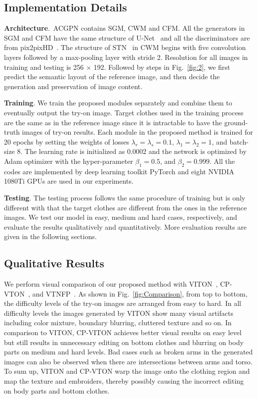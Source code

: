 \documentclass[10pt,twocolumn,letterpaper]{article}
\begin{document}
\subsection{Implementation Details}

\textbf{Architecture}.~ACGPN contains SGM, CWM and CFM. All the generators in SGM and CFM have the same structure of U-Net~\cite{ronneberger2015u} and all the discriminators are from pix2pixHD~\cite{DBLP:conf/cvpr/Wang0ZTKC18}. The structure of STN~\cite{jaderberg2015spatial} in CWM begins with five convolution layers followed by a max-pooling layer with stride 2. Resolution for all images in training and testing is 256 $\times$ 192. Followed by steps in Fig.~\ref{fig:2}, we first predict the semantic layout of the reference image, and then decide the generation and preservation of image content. 

\textbf{Training}.
We train the proposed modules separately and combine them to eventually output the try-on image. Target clothes used in the training process are the same as in the reference image since it is intractable to have the ground-truth images of try-on results. Each module in the proposed method is trained for 20 epochs by setting the weights of losses $\lambda_{r}=\lambda_{s}=0.1$, $\lambda_{1}=\lambda_{2}=1$, and batch-size 8. The learning rate is initialized as 0.0002 and the network is optimized by Adam optimizer with the hyper-parameter $\beta_1 = 0.5$, and $\beta_2 = 0.999$. All the codes are implemented by deep learning toolkit PyTorch and eight NVIDIA 1080Ti GPUs are used in our experiments.

\textbf{Testing}.
The testing process follows the same procedure of training but is only different with that the target clothes are different from the ones in the reference images. We test our model in easy, medium and hard cases, respectively, and evaluate the results qualitatively and quantitatively. More evaluation results are given in the following sections.





\subsection{Qualitative Results}
We perform visual comparison of our proposed method with VITON~\cite{DBLP:conf/cvpr/HanWWYD18}, CP-VTON~\cite{DBLP:conf/eccv/WangZLCLY18}, and VTNFP~\cite{Yu_2019_ICCV}. As shown in Fig.~\ref{fig:Comparison}, from top to bottom, the difficulty levels of the try-on images are arranged from easy to hard.
In all difficulty levels the images generated by VITON show many visual artifacts including color mixture, boundary blurring, cluttered texture and so on. In comparison to VITON, CP-VITON achieves better visual results on easy level but still results in unnecessary editing on bottom clothes and blurring on body parts on medium and hard levels.
Bad cases such as broken arms in the generated images can also be observed when there are intersections between arms and torso. To sum up, VITON and CP-VTON warp the image onto the clothing region and map the texture and embroiders, thereby possibly causing the incorrect editing on body parts and bottom clothes.
\end{document}
